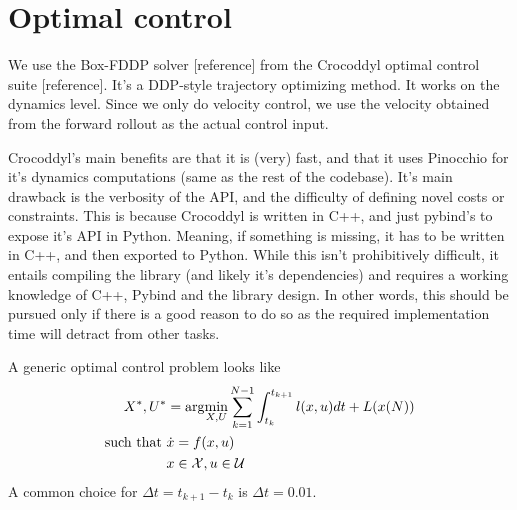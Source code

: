 \section{Optimal control}
We use the Box-FDDP solver [reference]
from the Crocoddyl optimal control suite [reference].
It's a DDP-style trajectory optimizing method.
It works on the dynamics level. Since we only do velocity 
control, we use the velocity obtained from the forward rollout
as the actual control input.

Crocoddyl's main benefits
are that it is (very) fast, and that it uses Pinocchio for
it's dynamics computations (same as the rest of the codebase).
It's main drawback is the verbosity of the API,
and the difficulty of defining novel costs or constraints.
This is because Crocoddyl is written in C++,
and just pybind's to expose it's API in Python.
Meaning, if something is missing, it has to be written in C++,
and then exported to Python. While this isn't prohibitively
difficult, it entails compiling the library (and likely
it's dependencies) and requires a working knowledge
of C++, Pybind and the library design.
In other words, this should be pursued only if there
is a good reason to do so as the required implementation
time will detract from other tasks.

A generic optimal control problem looks like
\begin{align}
X^{ * }, U^{ * } &= \arg\!\min_{X,U} \sum_{k=1}^{N-1} \int_{t_{ k }}^{t_{ k+1 }} l (x,u) dt +L (x (N)) \\
\text{such that } & \dot{x} = f (x,u)\\
& x \in \mathcal{X}, u \in \mathcal{U}\\
\end{align}
A common choice for $ \Delta t = t_{ k+1 } - t_{ k }  $ is
$ \Delta t = 0.01  $.


